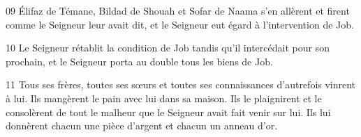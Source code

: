 
09 Élifaz de Témane, Bildad de Shouah et Sofar de Naama s’en allèrent et firent comme le Seigneur leur avait dit, et le Seigneur eut égard à l’intervention de Job.

10 Le Seigneur rétablit la condition de Job tandis qu’il intercédait pour son prochain, et le Seigneur porta au double tous les biens de Job.

11 Tous ses frères, toutes ses sœurs et toutes ses connaissances d’autrefois vinrent à lui. Ils mangèrent le pain avec lui dans sa maison. Ils le plaignirent et le consolèrent de tout le malheur que le Seigneur avait fait venir sur lui. Ils lui donnèrent chacun une pièce d’argent et chacun un anneau d’or.
